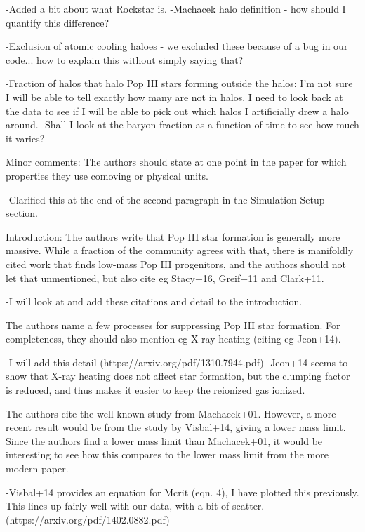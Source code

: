 \documentclass[11pt]{article}
\begin{document}
-Added a bit about what Rockstar is. 
-Machacek halo definition - how should I quantify this difference? 

-Exclusion of atomic cooling haloes - we excluded these because of a bug in our code... how to explain this without simply saying that?

-Fraction of halos that halo Pop III stars forming outside the halos: I'm not sure I will be able to tell exactly how many are not in halos. I need to look back at the data to see if I will be able to pick out which halos I artificially drew a halo around. 
-Shall I look at the baryon fraction as a function of time to see how much it varies? 

\begin{referee}
Minor comments:
The authors should state at one point in the paper for which properties they use
 comoving or physical units.
\end{referee}
-Clarified this at the end of the second paragraph in the Simulation Setup section.

\begin{referee}
Introduction:
The authors write that Pop III star formation is generally more massive. While a
 fraction of the community agrees with that, there is manifoldly cited work that
  finds low-mass Pop III progenitors, and the authors should not let that 
  unmentioned, but also cite eg Stacy+16, Greif+11 and Clark+11.
\end{referee}
-I will look at and add these citations and detail to the introduction.

\begin{referee}
The authors name a few processes for suppressing Pop III star formation. For 
completeness, they should also mention eg X-ray heating (citing eg Jeon+14). 
\end{referee}
-I will add this detail (https://arxiv.org/pdf/1310.7944.pdf)
-Jeon+14 seems to show that X-ray heating does not affect star formation, but 
the clumping factor is reduced, and thus makes it easier to keep the reionized 
gas ionized. 

\begin{referee}
The authors cite the well-known study from Machacek+01. However, a more recent 
result would be from the study by Visbal+14, giving a lower mass limit. Since 
the authors find a lower mass limit than Machacek+01, it would be interesting to
 see how this compares to the lower mass limit from the more modern paper.
\end{referee}
-Visbal+14 provides an equation for Mcrit (eqn. 4), I have plotted this previously. This lines up fairly well with our data, with a bit of scatter.  (https://arxiv.org/pdf/1402.0882.pdf) 
\end{document}

